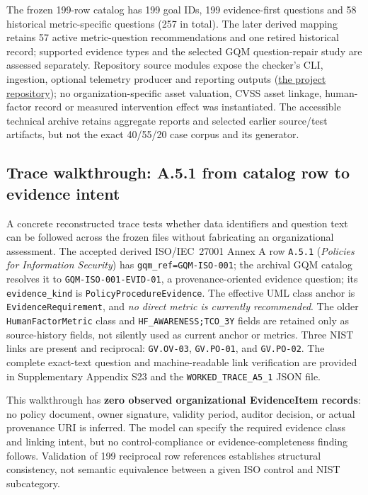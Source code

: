 \documentclass[12pt,a4paper]{article}
\newcommand{\RepoURL}{https://github.com/ErcanErkalkan/AI_Enabled_Standards_Aligned_Security_Risk_Management}
\newcommand{\RepoLink}{\href{\RepoURL}{the project repository}}
\begin{document}
The frozen 199-row catalog has 199 goal IDs, 199 evidence-first questions and 58 historical metric-specific questions (257 in total). The later derived mapping retains 57 active metric-question recommendations and one retired historical record; supported evidence types and the selected GQM question-repair study are assessed separately. Repository source modules expose the checker's CLI, ingestion, optional telemetry producer and reporting outputs (\RepoLink); no organization-specific asset valuation, CVSS asset linkage, human-factor record or measured intervention effect was instantiated. The accessible technical archive retains aggregate reports and selected earlier source/test artifacts, but not the exact 40/55/20 case corpus and its generator.

\subsection{Trace walkthrough: A.5.1 from catalog row to evidence intent}
\label{sec:trace-example}
A concrete reconstructed trace tests whether data identifiers and question text can be followed across the frozen files without fabricating an organizational assessment. The accepted derived ISO/IEC~27001 Annex A row \texttt{A.5.1} (\emph{Policies for Information Security}) has \texttt{gqm\_ref=GQM-ISO-001}; the archival GQM catalog resolves it to \texttt{GQM-ISO-001-EVID-01}, a provenance-oriented evidence question; its \texttt{evidence\_kind} is \texttt{PolicyProcedureEvidence}. The effective UML class anchor is \texttt{EvidenceRequirement}, and \emph{no direct metric is currently recommended}. The older \texttt{HumanFactorMetric} class and \texttt{HF\_AWARENESS;TCO\_3Y} fields are retained only as source-history fields, not silently used as current anchor or metrics. Three NIST links are present and reciprocal: \texttt{GV.OV-03}, \texttt{GV.PO-01}, and \texttt{GV.PO-02}. The complete exact-text question and machine-readable link verification are provided in Supplementary Appendix S23 and the \texttt{WORKED\_TRACE\_A5\_1} JSON file.

This walkthrough has \textbf{zero observed organizational EvidenceItem records}: no policy document, owner signature, validity period, auditor decision, or actual provenance URI is inferred. The model can specify the required evidence class and linking intent, but no control-compliance or evidence-completeness finding follows. Validation of 199 reciprocal row references establishes structural consistency, not semantic equivalence between a given ISO control and NIST subcategory.
\end{document}
